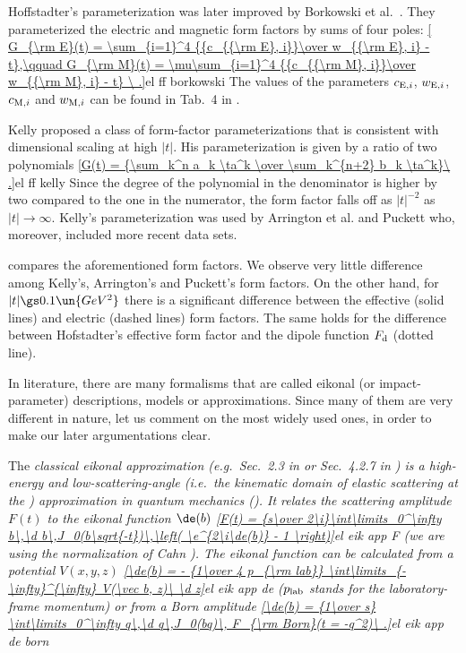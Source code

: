 Hoffstadter's parameterization was later improved by Borkowski et al.~. They parameterized the electric and magnetic form factors by sums of four poles:
\eqref{
G_{\rm E}(t) = \sum_{i=1}^4 {{c_{{\rm E}, i}}\over w_{{\rm E}, i} - t},\qquad
G_{\rm M}(t) = \mu\sum_{i=1}^4 {{c_{{\rm M}, i}}\over w_{{\rm M}, i} - t}
\ .}{el ff borkowski}
The values of the parameters $c_{{\rm E}, i}$, $w_{{\rm E}, i}$, $c_{{\rm M}, i}$ and $w_{{\rm M}, i}$ can be found in Tab.~4 in .

Kelly  proposed a class of form-factor parameterizations that is consistent with dimensional scaling at high $|t|$. His parameterization is given by a ratio of two polynomials
\eqref{G(t) = {\sum_k^n a_k \ta^k \over \sum_k^{n+2} b_k \ta^k}\ .}{el ff kelly}
Since the degree of the polynomial in the denominator is higher by two compared to the one in the numerator, the form factor falls off as $|t|^{-2}$ as $|t|\to\infty$. Kelly's parameterization was used by Arrington et al.  and Puckett  who, moreover, included more recent data sets.

 compares the aforementioned form factors. We observe very little difference among Kelly's, Arrington's and Puckett's form factors. On the other hand, for $|t| \gs 0.1\un{GeV^2}$ there is a significant difference between the effective (solid lines) and electric (dashed lines) form factors. The same holds for the difference between Hofstadter's effective form factor and the dipole function $F_{\rm d}$ (dotted line).



In literature, there are many formalisms that are called eikonal (or impact-parameter) descriptions, models or approximations. Since many of them are very different in nature, let us comment on the most widely used ones, in order to make our later argumentations clear.

The \em{classical eikonal approximation} (e.g.~Sec.~2.3 in  or Sec.~4.2.7 in ) is a high-energy and low-scattering-angle (i.e.~the kinematic domain of elastic scattering at the ) approximation in quantum mechanics (). It relates the scattering amplitude $F(t)$ to the eikonal function $\de(b)$
\eqref{F(t) = {s\over 2\i}\int\limits_0^\infty b\,\d b\,J_0(b\sqrt{-t})\,\left( \e^{2\i\de(b)} - 1 \right)}{el eik app F}
(we are using the normalization of Cahn ). The \em{eikonal} function can be calculated from a potential $V(x, y, z)$
\eqref{\de(b) = - {1\over 4 p_{\rm lab}} \int\limits_{-\infty}^{\infty} V(\vec b, z)\ \d z}{el eik app de}
($p_{\rm lab}$ stands for the laboratory-frame momentum) or from a Born amplitude
\eqref{\de(b) = {1\over s} \int\limits_0^\infty q\,\d q\,J_0(bq)\, F_{\rm Born}(t = -q^2)\ .}{el eik app de born}

